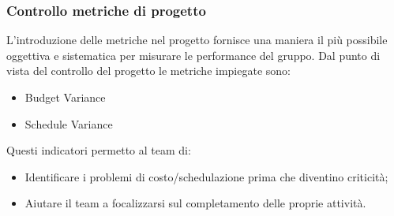 \documentclass[a4paper]{article}
\begin{document}
			\subsubsection{Controllo metriche di progetto}
				L'introduzione delle metriche nel progetto fornisce una maniera il più possibile oggettiva e sistematica per
				misurare le performance del gruppo. Dal punto di vista del controllo del progetto le metriche impiegate sono:
				\begin{itemize}
					\item Budget Variance
					\item Schedule Variance
				\end{itemize}
				Questi indicatori permetto al team di:
				\begin{itemize}
					\item Identificare i problemi di costo/schedulazione prima che diventino criticità;
					\item Aiutare il team a focalizzarsi sul completamento delle proprie attività.
				\end{itemize}

	\cleardoublepage
	\listoffigures

	\cleardoublepage
	\listoftables
\end{document}
